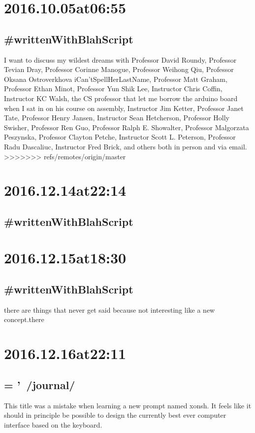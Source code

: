 \section*{ 2016.10.05at06:55 }
\subsection*{ #writtenWithBlahScript }
I want to discuss my wildest dreams with Professor David Roundy, Professor Tevian Dray, Professor Corinne Manogue, Professor Weihong Qiu, Professor Oksana Ostroverkhova iCan'tSpellHerLastName, Professor Matt Graham, Professor Ethan Minot, Professor Yun Shik Lee, Instructor Chris Coffin, Instructor KC Walsh, the CS professor that let me borrow the arduino board when I sat in on his course on assembly, Instructor Jim Ketter, Professor Janet Tate, Professor Henry Jansen, Instructor Sean Hetcherson, Professor Holly Swisher, Professor Ren Guo, Professor Ralph E. Showalter, Professor Malgorzata Peszynska, Professor Clayton Petche, Instructor Scott L. Peterson, Professor Radu Dascaliuc, Instructor Fred Brick, and others both in person and via email.
>>>>>>> refs/remotes/origin/master
\section*{ 2016.12.14at22:14 }
\subsection*{ #writtenWithBlahScript }


\section*{ 2016.12.15at18:30 }
\subsection*{ #writtenWithBlahScript }
there are things that never get said because not interesting like a new concept.there

\section*{ 2016.12.16at22:11 }
\subsection*{ = '~/journal/ }
This title was a mistake when learning a new prompt named xonsh. It feels like it should in principle be possible to design the currently best ever computer interface based on the keyboard.

